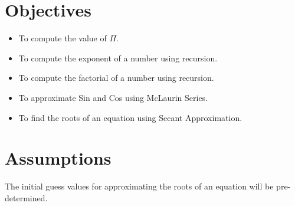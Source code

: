 \section{Objectives}
\begin{itemize}
  \item To compute the value of $\Pi$.
  \item To compute the exponent of a number using recursion.
  \item To compute the factorial of a number using recursion.
  \item To approximate Sin and Cos using McLaurin Series.
  \item To find the roots of an equation using Secant Approximation.
\end{itemize}

\section{Assumptions}
  The initial guess values for approximating the roots of an equation will be pre-determined.
